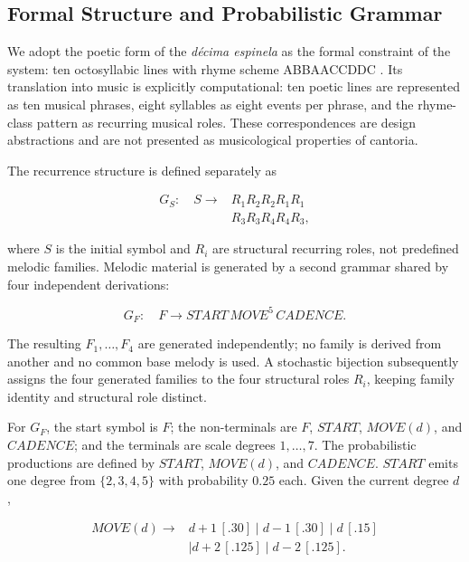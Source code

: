 \documentclass{article}
\begin{document}
\subsection{Formal Structure and Probabilistic Grammar}\label{subsec:formal_grammar}

We adopt the poetic form of the \textit{d\'ecima espinela} as the formal constraint of the system: ten octosyllabic lines with rhyme scheme ABBAACCDDC \cite{diazpimienta2021improvisacion}. Its translation into music is explicitly computational: ten poetic lines are represented as ten musical phrases, eight syllables as eight events per phrase, and the rhyme-class pattern as recurring musical roles. These correspondences are design abstractions and are not presented as musicological properties of cantoria.

The recurrence structure is defined separately as

\begin{equation}
\begin{aligned}
G_S:\quad S\rightarrow{}&R_1R_2R_2R_1R_1\\
                       &R_3R_3R_4R_4R_3,
\end{aligned}
\end{equation}

where \(S\) is the initial symbol and \(R_i\) are structural recurring roles, not predefined melodic families. Melodic material is generated by a second grammar shared by four independent derivations:

\begin{equation}
G_F:\quad
F\rightarrow START\,MOVE^5\,CADENCE.
\end{equation}

The resulting \(F_1,\ldots,F_4\) are generated independently; no family is derived from another and no common base melody is used. A stochastic bijection subsequently assigns the four generated families to the four structural roles \(R_i\), keeping family identity and structural role distinct.

For \(G_F\), the start symbol is \(F\); the non-terminals are \(F\), \(START\), \(MOVE(d)\), and \(CADENCE\); and the terminals are scale degrees \(1,\ldots,7\). The probabilistic productions are defined by \(START\), \(MOVE(d)\), and \(CADENCE\). \(START\) emits one degree from \(\{2,3,4,5\}\) with probability \(0.25\) each. Given the current degree \(d\),

\begin{equation}
\begin{aligned}
MOVE(d)\rightarrow{}&d+1\,[.30]\mid d-1\,[.30]\mid d\,[.15]\\
                    &\mid d+2\,[.125]\mid d-2\,[.125].
\end{aligned}
\end{equation}
\end{document}
